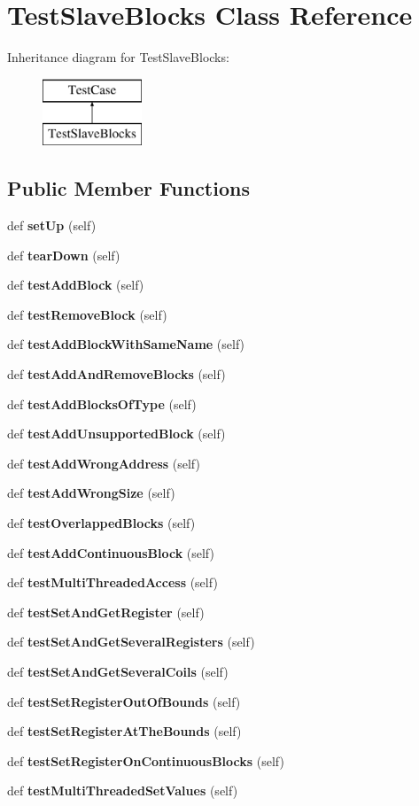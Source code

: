 \section{Test\+Slave\+Blocks Class Reference}
\label{classtests_1_1unittest__modbus_1_1_test_slave_blocks}
Inheritance diagram for Test\+Slave\+Blocks\+:\begin{figure}[H]
\begin{center}
\leavevmode
\includegraphics[height=2.000000cm]{classtests_1_1unittest__modbus_1_1_test_slave_blocks}
\end{center}
\end{figure}
\subsection*{Public Member Functions}
\begin{DoxyCompactItemize}
\item 
def {\bf set\+Up} (self)
\item 
def {\bf tear\+Down} (self)
\item 
def {\bf test\+Add\+Block} (self)
\item 
def {\bf test\+Remove\+Block} (self)
\item 
def {\bf test\+Add\+Block\+With\+Same\+Name} (self)
\item 
def {\bf test\+Add\+And\+Remove\+Blocks} (self)
\item 
def {\bf test\+Add\+Blocks\+Of\+Type} (self)
\item 
def {\bf test\+Add\+Unsupported\+Block} (self)
\item 
def {\bf test\+Add\+Wrong\+Address} (self)
\item 
def {\bf test\+Add\+Wrong\+Size} (self)
\item 
def {\bf test\+Overlapped\+Blocks} (self)
\item 
def {\bf test\+Add\+Continuous\+Block} (self)
\item 
def {\bf test\+Multi\+Threaded\+Access} (self)
\item 
def {\bf test\+Set\+And\+Get\+Register} (self)
\item 
def {\bf test\+Set\+And\+Get\+Several\+Registers} (self)
\item 
def {\bf test\+Set\+And\+Get\+Several\+Coils} (self)
\item 
def {\bf test\+Set\+Register\+Out\+Of\+Bounds} (self)
\item 
def {\bf test\+Set\+Register\+At\+The\+Bounds} (self)
\item 
def {\bf test\+Set\+Register\+On\+Continuous\+Blocks} (self)
\item 
def {\bf test\+Multi\+Threaded\+Set\+Values} (self)
\end{DoxyCompactItemize}


